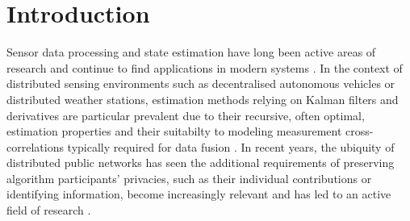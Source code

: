 \documentclass[conference]{IEEEtran}
\begin{document}
\section{Introduction}\label{sec:intro}
Sensor data processing and state estimation have long been active areas of research and continue to find applications in modern systems \cite{andersonOptimalFiltering1979,simonOptimalStateEstimation2006}. In the context of distributed sensing environments such as decentralised autonomous vehicles or distributed weather stations, estimation methods relying on Kalman filters and derivatives \cite{haugBayesianEstimationTracking2012} are particular prevalent due to their recursive, often optimal, estimation properties and their suitabilty to modeling measurement cross-correlations typically required for data fusion \cite{mutambaraDecentralizedEstimationControl1998,ligginsDistributedDataFusion2012}. In recent years, the ubiquity of distributed public networks has seen the additional requirements of preserving algorithm participants' privacies, such as their individual contributions or identifying information, become increasingly relevant and has led to an active field of research \cite{renSecurityChallengesPublic2012,brennerSecretProgramExecution2011}.
\end{document}
